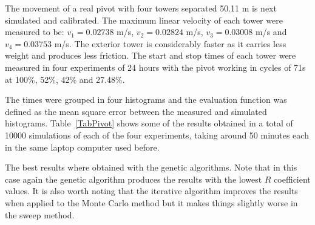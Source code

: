 \documentclass[review,authoryear]{elsarticle}
\begin{document}
The movement of a real pivot with four towers separated 50.11 m is next simulated and calibrated. The maximum linear velocity of each tower were measured to be: $v_1=0.02738$ m/s, $v_2=0.02824$ m/s, $v_3=0.03008$ m/s and $v_4=0.03753$ m/s.
The exterior tower is considerably faster as it carries less weight and produces less friction.
The start and stop times of each tower were measured in four experiments of 24 hours with the pivot working in cycles of 71s at 100\%, 52\%, 42\% and 27.48\%.

The times were grouped in four histograms and the evaluation function was defined as the mean square error between the measured and simulated histograms.
Table~\ref{TabPivot} shows some of the results obtained in a total of 10000 simulations of each of the four experiments, taking around 50 minutes each in the same laptop computer used before.

The best results where obtained with the genetic algorithms. Note that in this case again the genetic algorithm produces the results with the lowest $R$ coefficient values. It is also worth noting that the iterative algorithm improves the results when applied to the Monte Carlo method but it makes things slightly worse in the sweep method.
\end{document}

